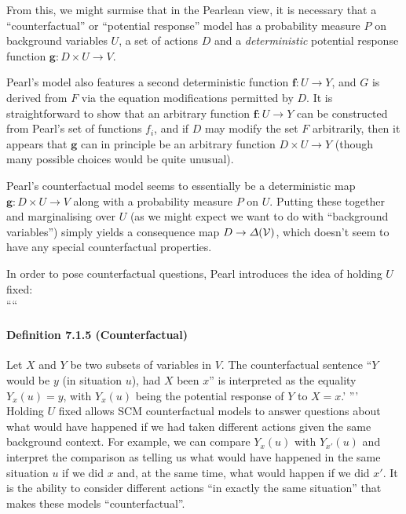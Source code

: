 From this, we might surmise that in the Pearlean view, it is necessary that a ``counterfactual'' or ``potential response'' model has a probability measure $P$ on background variables $U$, a set of actions $D$ and a \emph{deterministic} potential response function $\mathbf{g}:D\times U\to V$.

Pearl's model also features a second deterministic function $\mathbf{f}:U\to Y$, and $G$ is derived from $F$ via the equation modifications permitted by $D$. It is straightforward to show that an arbitrary function $\mathbf{f}:U\to Y$ can be constructed from Pearl's set of functions $f_i$, and if $D$ may modify the set $F$ arbitrarily, then it appears that $\mathbf{g}$ can in principle be an arbitrary function $D\times U\to Y$ (though many possible choices would be quite unusual).

Pearl's counterfactual model seems to essentially be a deterministic map $\mathbf{g}:D\times U\to V$ along with a probability measure $P$ on $U$. Putting these together and marginalising over $U$ (as we might expect we want to do with ``background variables'') simply yields a consequence map $D\to \Delta(\mathcal{V})$, which doesn't seem to have any special counterfactual properties.

In order to pose counterfactual questions, Pearl introduces the idea of holding $U$ fixed:
\\
````
\paragraph{Definition 7.1.5 (Counterfactual)}
Let $X$ and $Y$ be two subsets of variables in $V$. The counterfactual sentence ``$Y$ would be $y$ (in situation $u$), had $X$ been $x$'' is interpreted as the equality $Y_x(u) = y$, with $Y_x(u)$
being the potential response of $Y$ to $X = x$.'
'''
\\

Holding $U$ fixed allows SCM counterfactual models to answer questions about what would have happened if we had taken different actions given the same background context. For example, we can compare $Y_x(u)$ with $Y_{x'}(u)$ and interpret the comparison as telling us what would have happened in the same situation $u$ if we did $x$ and, at the same time, what would happen if we did $x'$. It is the ability to consider different actions ``in exactly the same situation'' that makes these models ``counterfactual''.

